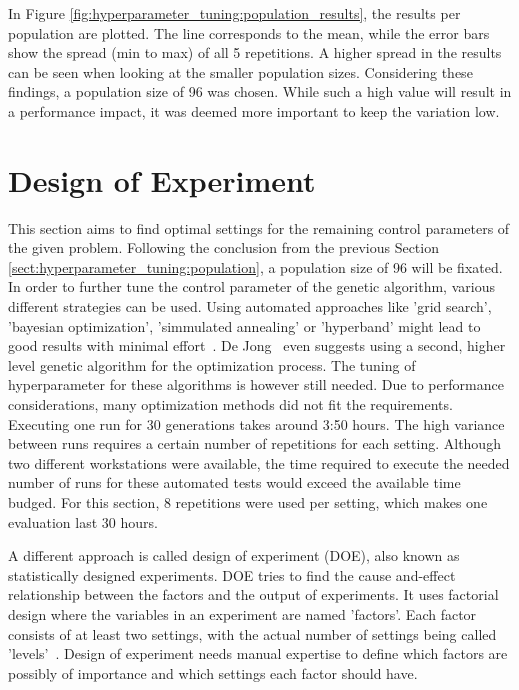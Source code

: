 In Figure \ref{fig:hyperparameter_tuning:population_results}, the results per population are plotted. The line corresponds to the mean, while the error bars show the spread (min to max) of all 5 repetitions. A higher spread in the results can be seen when looking at the smaller population sizes. Considering these findings, a population size of 96 was chosen. While such a high value will result in a performance impact, it was deemed more important to keep the variation low.

\section{Design of Experiment}
\label{sect:hyperparameter_tuning:design_of_experiment}
This section aims to find optimal settings for the remaining control parameters of the given problem. Following the conclusion from the previous Section \ref{sect:hyperparameter_tuning:population}, a population size of 96 will be fixated. In order to further tune the control parameter of the genetic algorithm, various different strategies can be used. Using automated approaches like 'grid search', 'bayesian optimization', 'simmulated annealing' or 'hyperband' might lead to good results with minimal effort~\cite{kacprzyk_parameter_2007}. De Jong~\cite{kacprzyk_parameter_2007} even suggests using a second, higher level genetic algorithm for the optimization process. The tuning of hyperparameter for these algorithms is however still needed. Due to performance considerations, many optimization methods did not fit the requirements. Executing one run for 30 generations takes around 3:50 hours. The high variance between runs requires a certain number of repetitions for each setting. Although two different workstations were available, the time required to execute the needed number of runs for these automated tests would exceed the available time budged. For this section, 8 repetitions were used per setting, which makes one evaluation last 30 hours.

A different approach is called design of experiment (DOE), also known as statistically designed experiments. DOE tries to find the cause and-effect relationship between the factors and the output of experiments. It uses factorial design where the variables in an experiment are named 'factors'. Each factor consists of at least two settings, with the actual number of settings being called 'levels'~\cite{yang_design_2009}. Design of experiment needs manual expertise to define which factors are possibly of importance and which settings each factor should have.

